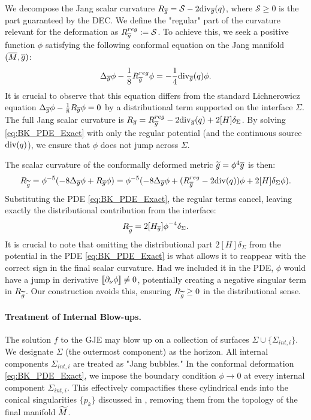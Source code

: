 We decompose the Jang scalar curvature $R_{\overline{g}} = \mathcal{S} - 2\mathrm{div}_{\overline{g}}(q)$, where $\mathcal{S} \ge 0$ is the part guaranteed by the DEC. We define the "regular" part of the curvature relevant for the deformation as $R_{\overline{g}}^{reg} := \mathcal{S}$.
To achieve this, we seek a positive function $\phi$ satisfying the following conformal equation on the Jang manifold $(\overline{M}, \overline{g})$:
\begin{equation}\label{eq:BK_PDE_Exact}
    \Delta_{\overline{g}} \phi - \frac{1}{8} R_{\overline{g}}^{reg} \phi = - \frac{1}{4} \mathrm{div}_{\overline{g}}(q) \phi.
\end{equation}
It is crucial to observe that this equation differs from the standard Lichnerowicz equation $\Delta_{\overline{g}} \phi - \frac{1}{8}R_{\overline{g}} \phi = 0$ by a distributional term supported on the interface $\Sigma$. The full Jang scalar curvature is $R_{\overline{g}} = R_{\overline{g}}^{reg} - 2\mathrm{div}_{\overline{g}}(q) + 2[H]\delta_\Sigma$. By solving \eqref{eq:BK_PDE_Exact} with only the regular potential (and the continuous source $\mathrm{div}(q)$), we ensure that $\phi$ does not jump across $\Sigma$.

The scalar curvature of the conformally deformed metric $\widetilde{g} = \phi^4 \overline{g}$ is then:
\[ R_{\widetilde{g}} = \phi^{-5} (-8\Delta_{\overline{g}}\phi + R_{\overline{g}} \phi) = \phi^{-5} (-8\Delta_{\overline{g}}\phi + (R_{\overline{g}}^{reg} - 2\mathrm{div}(q))\phi + 2[H]\delta_\Sigma \phi). \]
Substituting the PDE \eqref{eq:BK_PDE_Exact}, the regular terms cancel, leaving exactly the distributional contribution from the interface:
\begin{equation}\label{eq:DistCurvature}
    R_{\widetilde{g}} = 2[H_{\overline{g}}]\phi^{-4} \delta_\Sigma.
\end{equation}
It is crucial to note that omitting the distributional part $2[H]\delta_\Sigma$ from the potential in the PDE \eqref{eq:BK_PDE_Exact} is what allows it to reappear with the correct sign in the final scalar curvature. Had we included it in the PDE, $\phi$ would have a jump in derivative $[\![ \partial_\nu \phi ]\!] \neq 0$, potentially creating a negative singular term in $R_{\widetilde{g}}$. Our construction avoids this, ensuring $R_{\widetilde{g}} \ge 0$ in the distributional sense.

\paragraph{Treatment of Internal Blow-ups.}
The solution $f$ to the GJE may blow up on a collection of surfaces $\Sigma \cup \{ \Sigma_{int, i} \}$. We designate $\Sigma$ (the outermost component) as the horizon. All internal components $\Sigma_{int, i}$ are treated as "Jang bubbles."
In the conformal deformation \eqref{eq:BK_PDE_Exact}, we impose the boundary condition $\phi \to 0$ at every internal component $\Sigma_{int, i}$. This effectively compactifies these cylindrical ends into the conical singularities $\{p_k\}$ discussed in , removing them from the topology of the final manifold $\widetilde{M}$.

